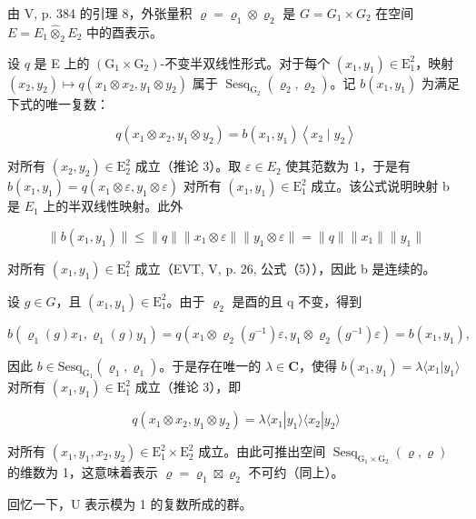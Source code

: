 由 V, p. 384 的引理 8，外张量积 \(\varrho = \varrho_{1} \otimes \varrho_{2}\) 是 \(G = G_{1} \times G_{2}\) 在空间 \(E = E_{1} \widehat{\otimes}_{2} E_{2}\) 中的酉表示。

设 \(q\) 是 E 上的 \((\mathrm{G}_1 \times \mathrm{G}_2)\)-不变半双线性形式。对于每个 \((x_1, y_1) \in \mathrm{E}_1^2\)，映射 \((x_2, y_2) \mapsto q(x_1 \otimes x_2, y_1 \otimes y_2)\) 属于 \(\operatorname{Sesq}_{\mathrm{G}_2}(\varrho_2, \varrho_2)\)。记 \(b(x_1, y_1)\) 为满足下式的唯一复数：

\[
q (x _ {1} \otimes x _ {2}, y _ {1} \otimes y _ {2}) = b (x _ {1}, y _ {1}) \left\langle x _ {2} \mid y _ {2} \right\rangle
\]

对所有 \((x_{2},y_{2})\in\mathrm{E}_{2}^{2}\) 成立（推论 3）。取 \(\varepsilon\in E_{2}\) 使其范数为 1，于是有 \(b(x_{1},y_{1})=q(x_{1}\otimes\varepsilon,y_{1}\otimes\varepsilon)\) 对所有 \((x_{1},y_{1})\in\mathrm{E}_{1}^{2}\) 成立。该公式说明映射 b 是 \(E_{1}\) 上的半双线性映射。此外

\[
\| b (x _ {1}, y _ {1}) \| \leqslant \| q \| \| x _ {1} \otimes \varepsilon \| \| y _ {1} \otimes \varepsilon \| = \| q \| \| x _ {1} \| \| y _ {1} \|
\]

对所有 \((x_{1},y_{1})\in\mathrm{E}_{1}^{2}\) 成立（EVT, V, p. 26, 公式（5）），因此 b 是连续的。

设 \(g \in G\)，且 \((x_{1}, y_{1}) \in \mathrm{E}_{1}^{2}\)。由于 \(\varrho_{2}\) 是酉的且 q 不变，得到

\[
b \left(\varrho_ {1} (g) x _ {1}, \varrho_ {1} (g) y _ {1}\right) = q \left(x _ {1} \otimes \varrho_ {2} \left(g ^ {- 1}\right) \varepsilon , y _ {1} \otimes \varrho_ {2} \left(g ^ {- 1}\right) \varepsilon\right) = b \left(x _ {1}, y _ {1}\right),
\]

因此 \(b \in \mathrm{Sesq}_{\mathrm{G}_1}(\varrho_1, \varrho_1)\)。于是存在唯一的 \(\lambda \in \mathbf{C}\)，使得 \(b(x_1, y_1) = \lambda \langle x_1 | y_1 \rangle\) 对所有 \((x_1, y_1) \in \mathrm{E}_1^2\) 成立（推论 3），即

\[
q (x _ {1} \otimes x _ {2}, y _ {1} \otimes y _ {2}) = \lambda \langle x _ {1} | y _ {1} \rangle \langle x _ {2} | y _ {2} \rangle
\]

对所有 \((x_{1},y_{1},x_{2},y_{2})\in\mathrm{E}_{1}^{2}\times\mathrm{E}_{2}^{2}\) 成立。由此可推出空间 \(\operatorname{Sesq}_{\mathrm{G}_{1}\times\mathrm{G}_{2}}(\varrho,\varrho)\) 的维数为 1，这意味着表示 \(\varrho=\varrho_{1}\boxtimes\varrho_{2}\) 不可约（同上）。

回忆一下，U 表示模为 1 的复数所成的群。

